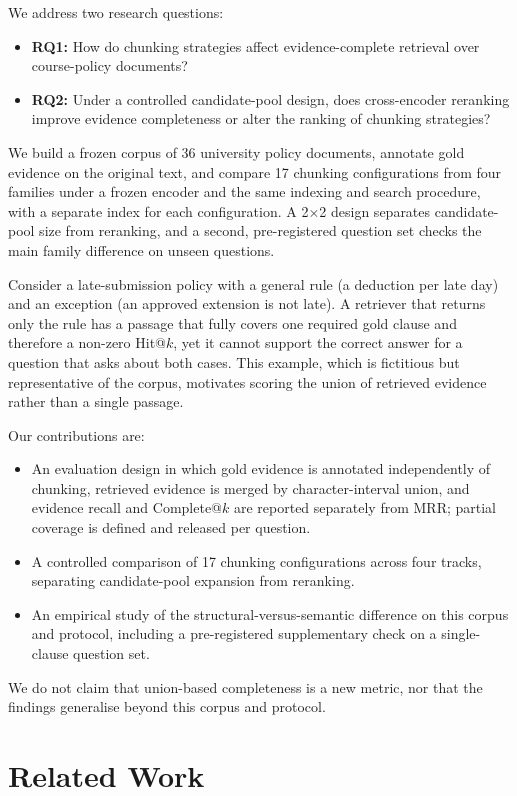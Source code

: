 \documentclass[conference]{IEEEtran}
\begin{document}
We address two research questions:
\begin{itemize}
\item \textbf{RQ1:} How do chunking strategies affect evidence-complete retrieval over course-policy documents?
\item \textbf{RQ2:} Under a controlled candidate-pool design, does cross-encoder reranking improve evidence completeness or alter the ranking of chunking strategies?
\end{itemize} We build a frozen corpus of 36 university policy documents, annotate gold evidence on the original text, and compare 17 chunking configurations from four families under a frozen encoder and the same indexing and search procedure, with a separate index for each configuration. A 2$\times$2 design separates candidate-pool size from reranking, and a second, pre-registered question set checks the main family difference on unseen questions.

Consider a late-submission policy with a general rule (a deduction per late day) and an exception (an approved extension is not late). A retriever that returns only the rule has a passage that fully covers one required gold clause and therefore a non-zero Hit@$k$, yet it cannot support the correct answer for a question that asks about both cases. This example, which is fictitious but representative of the corpus, motivates scoring the union of retrieved evidence rather than a single passage.

Our contributions are:
\begin{itemize}
\item An evaluation design in which gold evidence is annotated independently of chunking, retrieved evidence is merged by character-interval union, and evidence recall and Complete@$k$ are reported separately from MRR; partial coverage is defined and released per question.
\item A controlled comparison of 17 chunking configurations across four tracks, separating candidate-pool expansion from reranking.
\item An empirical study of the structural-versus-semantic difference on this corpus and protocol, including a pre-registered supplementary check on a single-clause question set.
\end{itemize}

We do not claim that union-based completeness is a new metric, nor that the findings generalise beyond this corpus and protocol.

\section{Related Work}
\end{document}
